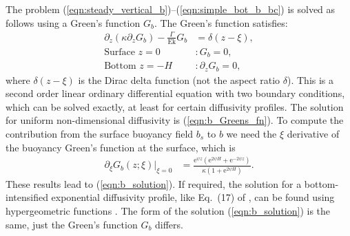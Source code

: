 \documentclass{ametsocV6.2}
\begin{document}
The problem (\ref{eqn:steady_vertical_b})--(\ref{eqn:simple_bot_b_bc}) is solved as follows using a Green's function $G_b$.
The Green's function satisfies:
\begin{align}
\partial_ z \left( \kappa \partial_z G_b \right) - \frac{\Gamma }{\mathrm{Ek}} G_b & =  \delta(z - \xi) , \label{eqn:Gsfn}\\
\text{Surface~}z = 0 &: G_b = 0 , \label{eqn:Gsfn_sfcbc} \\
\text{Bottom~}z = -H &: \partial_z G_b = 0 ,
\label{eqn:Gsfn_botbc}
\end{align}
where $\delta(z - \xi)$ is the Dirac delta function (not the aspect ratio $\delta$).
This is a second order linear ordinary differential equation with two boundary conditions, which can be solved exactly, at least for certain diffusivity profiles.
The solution for uniform non-dimensional diffusivity is (\ref{eqn:b_Greens_fn}).
To compute the contribution from the surface buoyancy field $b_s$ to $b$ we need the $\xi$ derivative of the buoyancy Green's function at the surface, which is
\begin{align}
\partial_\xi G_b(z;\xi)|_{\xi = 0} &=  \frac{\mathrm{e}^{\psi z} \left( \mathrm{e}^{2 \psi H} + \mathrm{e}^{-2 \psi z}\right)}{\kappa \left(1 + \mathrm{e}^{2 \psi H} \right)} .
\label{eqn:dG_b_d_xi}
\end{align}
These results lead to (\ref{eqn:b_solution}).
If required, the solution for a bottom-intensified exponential diffusivity profile, like Eq.~(17) of \citet{peterson&callies26}, can be found using hypergeometric functions \citep{arfken&weber95}.
The form of the solution (\ref{eqn:b_solution}) is the same, just the Green's function $G_b$ differs.
\end{document}
